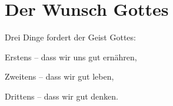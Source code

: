 \chapter{Der Wunsch Gottes}

Drei Dinge fordert der Geist Gottes:


Erstens -- dass wir uns gut ernähren,


Zweitens -- dass wir gut leben,


Drittens -- dass wir gut denken.
